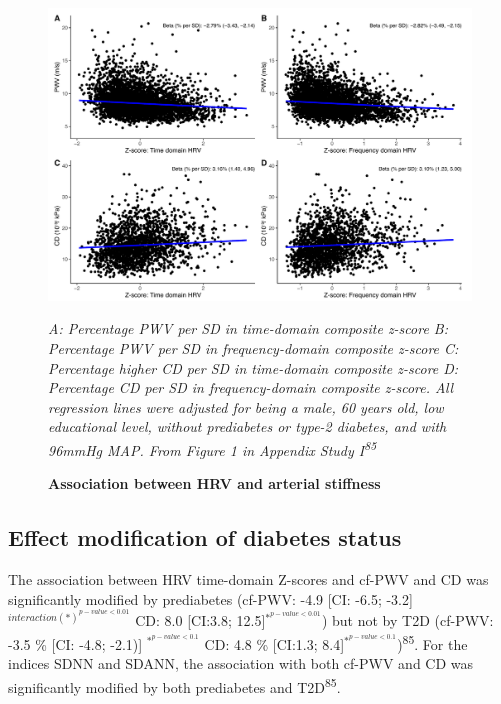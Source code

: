 \documentclass[
  a4paper,
  headsepline=true,
  open=left]{scrbook}
\begin{document}
\begin{figure}

{\centering 

\includegraphics{images/figure3_linear_plot.pdf}

\emph{A: Percentage PWV per SD in time-domain composite z-score B:
Percentage PWV per SD in frequency-domain composite z-score C:
Percentage higher CD per SD in time-domain composite z-score D:
Percentage CD per SD in frequency-domain composite z-score. All
regression lines were adjusted for being a male, 60 years old, low
educational level, without prediabetes or type-2 diabetes, and with
96mmHg MAP. From Figure 1 in Appendix Study I\textsuperscript{85}}

}

\caption{\label{fig-MS-HRV}\textbf{Association between HRV and arterial
stiffness}}

\end{figure}

\hypertarget{effect-modification-of-diabetes-status}{%
\subsection{Effect modification of diabetes
status}\label{effect-modification-of-diabetes-status}}

The association between HRV time-domain Z-scores and cf-PWV and CD was
significantly modified by prediabetes (cf-PWV: -4.9 {[}CI: -6.5; -3.2{]}
\(^{interaction(*) ^{p-value< 0.01}}\) CD: 8.0 {[}CI:3.8;
12.5{]}\(^{*^{p-value< 0.01}}\)) but not by T2D (cf-PWV: -3.5 \% {[}CI:
-4.8; -2.1){]} \(^{*^{p-value< 0.1}}\) CD: 4.8 \% {[}CI:1.3;
8.4{]}\(^{*^{p-value< 0.1}}\))\textsuperscript{85}. For the indices SDNN
and SDANN, the association with both cf-PWV and CD was significantly
modified by both prediabetes and T2D\textsuperscript{85}.
\end{document}
